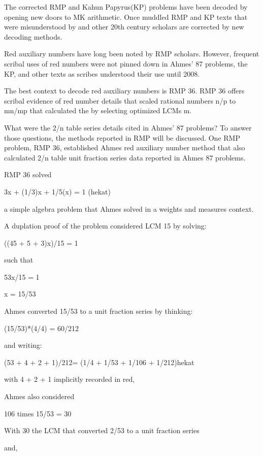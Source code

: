 \documentclass[12pt]{article}
\begin{document}
The corrected RMP and Kahun Papyrus(KP) problems have been decoded by opening new doors to MK arithmetic. Once muddled RMP and KP texts that were misunderstood by  and other 20th century scholars are corrected by new decoding methods.

Red auxiliary numbers have long been noted by RMP scholars. However, frequent scribal uses of red numbers were not pinned down in Ahmes' 87 problems, the KP, and other texts as scribes understood their use until 2008. 

The best context to decode red auxiliary numbers is RMP 36. RMP 36 offers scribal evidence of red number details that scaled rational numbers n/p to mn/mp that calculated the  by selecting optimized LCMs m.

What were the 2/n table series details cited in Ahmes' 87 problems? To answer those questions, the methods reported in RMP will be discussed. One RMP problem, RMP 36, established Ahmes red auxiliary number method that also calculated 2/n table unit fraction series data reported in Ahmes 87 problems.

RMP 36 solved 

3x + (1/3)x + 1/5(x) = 1 (hekat)

a simple algebra problem that Ahmes solved in a weights and measures context.

A duplation proof of the problem considered LCM 15 by solving:

((45 + 5 + 3)x)/15 = 1

such that

53x/15 = 1

x = 15/53

Ahmes converted 15/53 to a unit fraction series by thinking: 

(15/53)*(4/4) = 60/212

and writing:

(53 + 4 + 2 + 1)/212= (1/4 + 1/53 + 1/106 + 1/212)hekat

with 4 + 2 + 1 implicitly recorded in red,

Ahmes also considered 

106 times 15/53 = 30 

With 30 the LCM that converted 2/53 to a unit fraction series

and,
\end{document}
